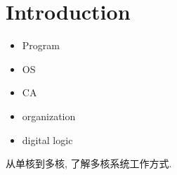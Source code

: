 \newpage
\section{Introduction}
\begin{itemize}
    \item Program
    \item OS
    \item CA
    \item organization
    \item digital logic
\end{itemize}

从单核到多核, 了解多核系统工作方式. 